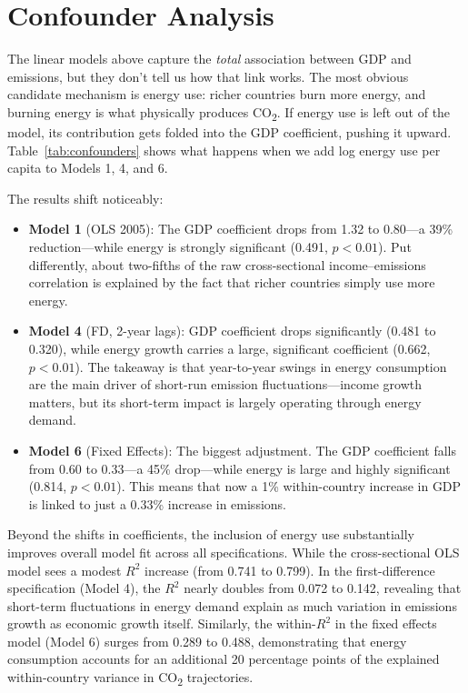 \documentclass[12pt, a4paper]{article}
\begin{document}
\section{Confounder Analysis}

The linear models above capture the \emph{total} association between GDP and emissions, but they don't tell us how that link works. The most obvious candidate mechanism is energy use: richer countries burn more energy, and burning energy is what physically produces CO\textsubscript{2}. If energy use is left out of the model, its contribution gets folded into the GDP coefficient, pushing it upward. Table~\ref{tab:confounders} shows what happens when we add log energy use per capita to Models 1, 4, and 6.

The results shift noticeably:

\begin{itemize}
    \item \textbf{Model 1} (OLS 2005): The GDP coefficient drops from 1.32 to 0.80---a 39\% reduction---while energy is strongly significant (0.491, $p < 0.01$). Put differently, about two-fifths of the raw cross-sectional income--emissions correlation is explained by the fact that richer countries simply use more energy.
    \item \textbf{Model 4} (FD, 2-year lags): GDP coefficient drops significantly (0.481 to 0.320), while energy growth carries a large, significant coefficient (0.662, $p < 0.01$). The takeaway is that year-to-year swings in energy consumption are the main driver of short-run emission fluctuations—income growth matters, but its short-term impact is largely operating through energy demand.
    \item \textbf{Model 6} (Fixed Effects): The biggest adjustment. The GDP coefficient falls from 0.60 to 0.33---a 45\% drop---while energy is large and highly significant (0.814, $p < 0.01$). This means that now a 1\% within-country increase in GDP is linked to just a 0.33\% increase in emissions.
\end{itemize}

Beyond the shifts in coefficients, the inclusion of energy use substantially improves overall model fit across all specifications. While the cross-sectional OLS model sees a modest $R^2$ increase (from 0.741 to 0.799). In the first-difference specification (Model 4), the $R^2$ nearly doubles from 0.072 to 0.142, revealing that short-term fluctuations in energy demand explain as much variation in emissions growth as economic growth itself. Similarly, the within-$R^2$ in the fixed effects model (Model 6) surges from 0.289 to 0.488, demonstrating that energy consumption accounts for an additional 20 percentage points of the explained within-country variance in CO\textsubscript{2} trajectories.
\end{document}
